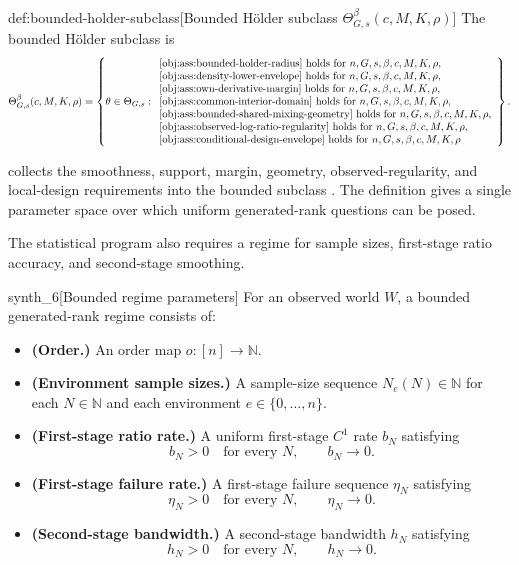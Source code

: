 \begin{definitionv}{def:bounded-holder-subclass}[Bounded Hölder subclass $\Theta^{\beta}_{G,s}(c,M,K,\rho)$]
The bounded Hölder subclass is
\[
\Theta^{\beta}_{G,s}(c,M,K,\rho)
=
\left\{
\theta\in\Theta_{G,s}:
\begin{array}{l}
\text{\cref{obj:ass:bounded-holder-radius} holds for } n,G,s,\beta,c,M,K,\rho,\\
\text{\cref{obj:ass:density-lower-envelope} holds for } n,G,s,\beta,c,M,K,\rho,\\
\text{\cref{obj:ass:own-derivative-margin} holds for } n,G,s,\beta,c,M,K,\rho,\\
\text{\cref{obj:ass:common-interior-domain} holds for } n,G,s,\beta,c,M,K,\rho,\\
\text{\cref{obj:ass:bounded-shared-mixing-geometry} holds for } n,G,s,\beta,c,M,K,\rho,\\
\text{\cref{obj:ass:observed-log-ratio-regularity} holds for } n,G,s,\beta,c,M,K,\rho,\\
\text{\cref{obj:ass:conditional-design-envelope} holds for } n,G,s,\beta,c,M,K,\rho
\end{array}
\right\}.
\]
\end{definitionv}

 collects the smoothness, support, margin, geometry, observed-regularity, and local-design requirements into the bounded subclass . The definition gives a single parameter space over which uniform generated-rank questions can be posed.

The statistical program also requires a regime for sample sizes, first-stage ratio accuracy, and second-stage smoothing.

\begin{definitionv}{synth_6}[Bounded regime parameters]
For an observed world \(W\), a bounded generated-rank regime consists of:
\begin{itemize}
\item \textbf{(Order.)} An order map \(o:[n]\to\mathbb N\).
\item \textbf{(Environment sample sizes.)} A sample-size sequence \(N_e(N)\in\mathbb N\) for each \(N\in\mathbb N\) and each environment \(e\in\{0,\ldots,n\}\).
\item \textbf{(First-stage ratio rate.)} A uniform first-stage \(C^1\) rate \(b_N\) satisfying
\[
b_N>0\quad\text{for every }N,
\qquad
b_N\to 0.
\]
\item \textbf{(First-stage failure rate.)} A first-stage failure sequence \(\eta_N\) satisfying
\[
\eta_N>0\quad\text{for every }N,
\qquad
\eta_N\to 0.
\]
\item \textbf{(Second-stage bandwidth.)} A second-stage bandwidth \(h_N\) satisfying
\[
h_N>0\quad\text{for every }N,
\qquad
h_N\to 0.
\]
\end{itemize}
\end{definitionv}

